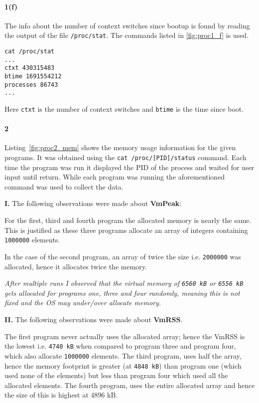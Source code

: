 \documentclass[final,5p,times,authoryear]{elsarticle}
\begin{document}
\paragraph{\bf 1(f)}
The info about the number of context switches since bootup is found by reading the output of the file {\tt /proc/stat}. The commands listed in \ref{fig:proc1_f} is used.
\begin{lstlisting}[captionpos=b, caption={Snippet showing memory usage status.},label={fig:proc1_f},style=codeBash]
cat /proc/stat
...
ctxt 430315483
btime 1691554212
processes 86743
...
\end{lstlisting}
Here {\tt ctxt} is the number of context switches and {\tt btime} is the time since boot.

\pagebreak

\paragraph{\bf 2}
Listing~\ref{fig:proc2_mem} shows the memory usage information for the given programs. It was obtained using the {\tt cat /proc/[PID]/status} command.
Each time the program was run it displayed the PID of the process and waited for user input until return.
While each program was running the aforementioned command was used to collect the data.

\vspace{10px}

\noindent
{\bf I.} The following observations were made about {\bf VmPeak}:

\noindent
For the first, third and fourth program the allocated memory is nearly the same. 
This is justified as these three programs allocate an array of integers containing {\tt 1000000} elements. 

In the case of the second program, an array of twice the size i.e. {\tt 2000000} was allocated, hence it allocates twice the memory.


{\it After multiple runs I observed that the virtual memory of {\tt 6560 kB} or {\tt 6556 kB} gets allocated for programs one, three and four randomly, meaning this is not fixed and the OS may under/over allocate memory.}

\vspace{10px}

\noindent
{\bf II.} The following observations were made about {\bf VmRSS}. 

The first program never actually uses the allocated array; hence the VmRSS is the lowest i.e. {\tt 4740 kB} when compared to program three and program four, which also allocate {\tt 1000000} elements.
The third program, uses half the array, hence the memory footprint is greater (at {\tt 4848 kB}) than program one (which used none of the elements) but less than program four which used all the allocated elements.
The fourth program, uses the entire allocated array and hence the size of this is highest at {4896 kB}.
\end{document}
